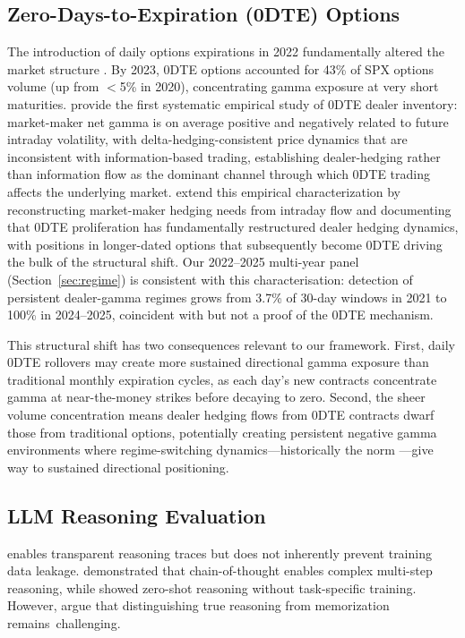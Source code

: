 \documentclass[jrfm,article,accept,moreauthors,pdftex]{Definitions/mdpi}
\begin{document}
\subsection{Zero-Days-to-Expiration (0DTE) Options}

The introduction of daily options expirations in 2022 fundamentally altered the market structure \citep{cboe2024zero}. By 2023, 0DTE options accounted for 43\% of SPX options volume (up from $<$5\% in 2020), concentrating gamma exposure at very short maturities. \citet{dim2023odtes} provide the first systematic empirical study of 0DTE dealer inventory: market-maker net gamma is on average positive and negatively related to future intraday volatility, with delta-hedging-consistent price dynamics that are inconsistent with information-based trading, establishing dealer-hedging rather than information flow as the dominant channel through which 0DTE trading affects the underlying market. %
 \citet{adams2025zerodte} extend this empirical characterization by reconstructing market-maker hedging needs from intraday flow and documenting that 0DTE proliferation has fundamentally restructured dealer hedging dynamics, with positions in longer-dated options that subsequently become 0DTE driving the bulk of the structural shift. Our 2022--2025 multi-year panel (Section~\ref{sec:regime}) is consistent with this characterisation: detection of persistent dealer-gamma regimes grows from 3.7\% of 30-day windows in 2021 to 100\% in 2024--2025, coincident with but not a proof of the 0DTE mechanism.

This structural shift has two consequences relevant to our framework. First, daily 0DTE rollovers may create more sustained directional gamma exposure than traditional monthly expiration cycles, as each day's new contracts concentrate gamma at near-the-money strikes before decaying to zero. Second, the sheer volume concentration means dealer hedging flows from 0DTE contracts dwarf those from traditional options, potentially creating persistent negative gamma environments where regime-switching \mbox{dynamics---historically} the norm \citep{ni2005stock}---give way to sustained directional positioning.

\subsection{LLM Reasoning Evaluation}

 enables transparent reasoning traces but does not inherently prevent training data leakage. \citet{wei2022chain} demonstrated that chain-of-thought enables complex multi-step reasoning, while \citet{kojima2022large} showed zero-shot reasoning without task-specific training. However, \citet{marcus2019rebooting} argue that distinguishing true reasoning from memorization remains~challenging.
\end{document}
